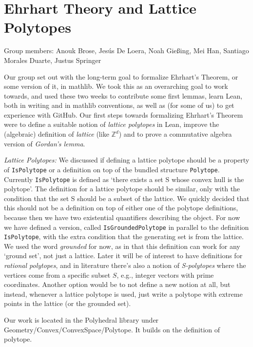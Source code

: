 \section{Ehrhart Theory and Lattice Polytopes}

\newcommand{\Z}{\mathbb{Z}}
\newcommand{\Q}{\mathbb{Q}}
\newcommand{\R}{\mathbb{R}}


Group members: Anouk Brose, Jesús De Loera, Noah Gießing, Mei Han, Santiago Morales Duarte, Justus Springer
\bigskip

Our group set out with the long-term goal to formalize Ehrhart's Theorem, or some version of it, in mathlib. We took this as an overarching goal to work towards, and used these two weeks to contribute some first lemmas, learn Lean, both in writing and in mathlib conventions, as well as (for some of us) to get experience with GitHub. Our first steps towards formalizing Ehrhart's Theorem were to define a suitable notion of \textit{lattice polytopes} in Lean, improve the (algebraic) definition of \textit{lattice} (like $\mathbb{Z}^d$) and to prove a commutative algebra version of \textit{Gordan's lemma}.
 \bigskip

\textit{Lattice Polytopes:} We discussed if defining a lattice polytope should be a property of \lstinline{IsPolytope} or a definition on top of the bundled structure \lstinline|Polytope|. Currently \lstinline{IsPolytope} is defined as `there exists a set S whose convex hull is the polytope'. The definition for a lattice polytope should be similar, only with the condition that the set S should be a subset of the lattice. We quickly decided that this should not be a definition on top of either one of the polytope definitions, because then we have two existential quantifiers describing the object. For now we have defined a version, called \lstinline|IsGroundedPolytope| in parallel to the definition \lstinline|IsPolytope|, with the extra condition that the generating set is from the lattice. We used the word \textit{grounded} for now, as in that this definition can work for any `ground set', not just a lattice. Later it will be of interest to have definitions for \textit{rational polytopes}, and in literature there's also a notion of \textit{S-polytopes} where the vertices come from a specific subset $S$, e.g., integer vectors with prime coordinates. Another option would be to not define a new notion at all, but instead, whenever a lattice polytope is used, just write a polytope with extreme points in the lattice (or the grounded set).
\medskip

Our work is located in the Polyhedral library under Geometry/Convex/ConvexSpace/Polytope. It builds on the definition of polytope.
\medskip

